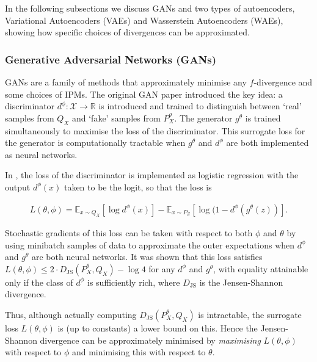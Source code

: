 In the following subsections we discuss GANs and two types of autoencoders, Variational Autoencoders (VAEs) and Wasserstein Autoencoders (WAEs), showing how specific choices of divergences can be approximated.

\subsubsection{Generative Adversarial Networks (GANs)}

GANs are a family of methods that approximately minimise any $f$-divergence and some choices of IPMs. 
The original GAN paper \citep{goodfellow} introduced the key idea: a discriminator $d^\phi: \mathcal{X} \to \mathbb{R}$ is introduced and trained to distinguish between `real' samples from $Q_X$ and `fake' samples from $P^\theta_X$. 
The generator $g^\theta$ is trained simultaneously to maximise the loss of the discriminator. 
This surrogate loss for the generator is computationally tractable when $g^\theta$ and $d^\phi$ are both implemented as neural networks.

In \cite{goodfellow}, the loss of the discriminator is implemented as logistic regression with the output $d^\phi(x)$ taken to be the logit, so that the loss is

\begin{align*}
L(\theta, \phi) = \mathbb{E}_{x\sim Q_X}\left[ \log d^\phi(x) \right] - \mathbb{E}_{x \sim P_Z} \left[\log(1 - d^\phi(g^\theta(z)) \right].
\end{align*}

Stochastic gradients of this loss can be taken with respect to both $\phi$ and $\theta$ by using minibatch samples of data to approximate the outer expectations when $d^\phi$ and $g^\theta$ are both neural networks.
It was shown that this loss satisfies $L(\theta, \phi) \leq 2 \cdot D_{\text{JS}}(P^\theta_X, Q_X) - \log 4$ for any $d^\phi$ and $g^\theta$, with equality attainable only if the class of $d^\phi$ is sufficiently rich, where $D_{\text{JS}}$ is the Jensen-Shannon divergence. 

Thus, although actually computing $D_{\text{JS}}(P^\theta_X, Q_X)$ is intractable, the surrogate loss $L(\theta, \phi)$ is (up to constants) a lower bound on this.
Hence the Jensen-Shannon divergence can be approximately minimised by \emph{maximising} $L(\theta, \phi)$ with respect to $\phi$ and minimising this with respect to $\theta$.

